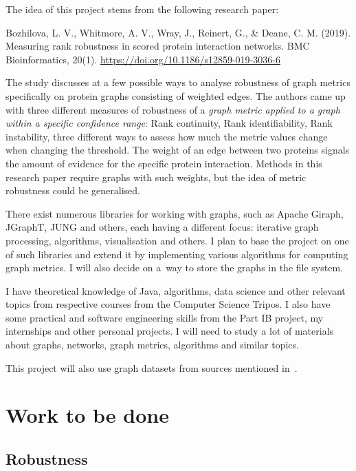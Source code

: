 \documentclass[12pt,a4paper,twoside]{article}
\begin{document}
    The idea of this project stems from the following research paper:
    
    \begin{adjustwidth}{1cm}{}
    Bozhilova, L. V., Whitmore, A. V., Wray, J., Reinert, G., \& Deane, C. M. (2019). Measuring rank robustness in scored protein interaction networks. BMC Bioinformatics, 20(1). \url{https://doi.org/10.1186/s12859-019-3036-6}
    \end{adjustwidth}
    
    The study discusses at a few possible ways to analyse robustness of graph metrics specifically on protein graphs consisting of weighted edges. The authors came up with three different measures of robustness of a \textit{graph metric applied to a graph within a specific confidence range}: Rank continuity, Rank identifiability, Rank instability, three different ways to assess how much the metric values change when changing the threshold. The weight of an edge between two proteins signals the amount of evidence for the specific protein interaction. Methods in this research paper require graphs with such weights, but the idea of metric robustness could be generalised.

    There exist numerous libraries for working with graphs, such as Apache Giraph, JGraphT, JUNG and others, each having a different focus: iterative graph processing, algorithms, visualisation and others. I plan to base the project on one of such libraries and extend it by implementing various algorithms for computing graph metrics. I will also decide on a~way to store the graphs in the file system.
    
    I have theoretical knowledge of Java, algorithms, data science and other relevant topics from respective courses from the Computer Science Tripos. I also have some practical and software engineering skills from the Part IB project, my internships and other personal projects. I will need to study a lot of materials about graphs, networks, graph metrics, algorithms and similar topics.
    
    This project will also use graph datasets from sources mentioned in~.

\section*{Work to be done}

    \subsection*{Robustness}
\end{document}
